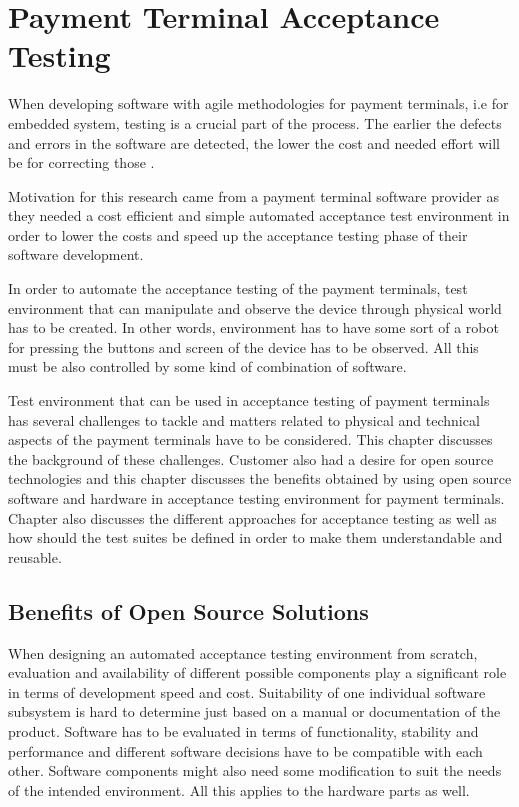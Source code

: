 
\chapter{Payment Terminal Acceptance Testing}
\label{chapter:Payment terminal acceptance testing} 

When developing software with agile methodologies for payment terminals, i.e for embedded system, testing is a crucial part of the process. The earlier the defects and errors in the software are detected, the lower the cost and needed effort will be for correcting those \emph{\citep{myers2011art}}.

Motivation for this research came from a payment terminal software provider as they needed a cost efficient and simple automated acceptance test environment in order to lower the costs and speed up the acceptance testing phase of their software development.

In order to automate the acceptance testing of the payment terminals, test environment that can manipulate and observe the device through physical world has to be created. In other words, environment has to have some sort of a robot for pressing the buttons and screen of the device has to be observed. All this must be also controlled by some kind of combination of software.

Test environment that can be used in acceptance testing of payment terminals has several challenges to tackle and matters related to physical and technical aspects of the payment terminals have to be considered. This chapter discusses the background of these challenges. Customer also had a desire for open source technologies and this chapter discusses the benefits obtained by using open source software and hardware in acceptance testing environment for payment terminals. Chapter also discusses the different approaches for acceptance testing as well as how should the test suites be defined in order to make them understandable and reusable.

\section{Benefits of Open Source Solutions}
\label{section:Open source}

When designing an automated acceptance testing environment from scratch, evaluation and availability of different possible components play a significant role in terms of development speed and cost. Suitability of one individual software subsystem is hard to determine just based on a manual or documentation of the product. Software has to be evaluated in terms of functionality, stability and performance and different software decisions have to be compatible with each other. Software components might also need some modification to suit the needs of the intended environment. All this applies to the hardware parts as well.

